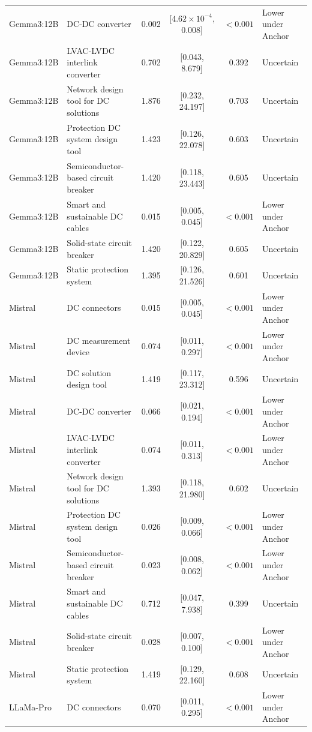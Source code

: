 \begin{longtable}[tbp]{p{2.2cm}p{5.0cm}cccp{3.2cm}}
Gemma3:12B & DC-DC converter & 0.002 & [$4.62\times 10^{-4}$, 0.008] & $<0.001$ & Lower under Anchor \\
Gemma3:12B & LVAC-LVDC interlink converter & 0.702 & [0.043, 8.679] & 0.392 & Uncertain \\
Gemma3:12B & Network design tool for DC solutions & 1.876 & [0.232, 24.197] & 0.703 & Uncertain \\
Gemma3:12B & Protection DC system design tool & 1.423 & [0.126, 22.078] & 0.603 & Uncertain \\
Gemma3:12B & Semiconductor-based circuit breaker & 1.420 & [0.118, 23.443] & 0.605 & Uncertain \\
Gemma3:12B & Smart and sustainable DC cables & 0.015 & [0.005, 0.045] & $<0.001$ & Lower under Anchor \\
Gemma3:12B & Solid-state circuit breaker & 1.420 & [0.122, 20.829] & 0.605 & Uncertain \\
Gemma3:12B & Static protection system & 1.395 & [0.126, 21.526] & 0.601 & Uncertain \\
Mistral & DC connectors & 0.015 & [0.005, 0.045] & $<0.001$ & Lower under Anchor \\
Mistral & DC measurement device & 0.074 & [0.011, 0.297] & $<0.001$ & Lower under Anchor \\
Mistral & DC solution design tool & 1.419 & [0.117, 23.312] & 0.596 & Uncertain \\
Mistral & DC-DC converter & 0.066 & [0.021, 0.194] & $<0.001$ & Lower under Anchor \\
Mistral & LVAC-LVDC interlink converter & 0.074 & [0.011, 0.313] & $<0.001$ & Lower under Anchor \\
Mistral & Network design tool for DC solutions & 1.393 & [0.118, 21.980] & 0.602 & Uncertain \\
Mistral & Protection DC system design tool & 0.026 & [0.009, 0.066] & $<0.001$ & Lower under Anchor \\
Mistral & Semiconductor-based circuit breaker & 0.023 & [0.008, 0.062] & $<0.001$ & Lower under Anchor \\
Mistral & Smart and sustainable DC cables & 0.712 & [0.047, 7.938] & 0.399 & Uncertain \\
Mistral & Solid-state circuit breaker & 0.028 & [0.007, 0.100] & $<0.001$ & Lower under Anchor \\
Mistral & Static protection system & 1.419 & [0.129, 22.160] & 0.608 & Uncertain \\
LLaMa-Pro & DC connectors & 0.070 & [0.011, 0.295] & $<0.001$ & Lower under Anchor \\

\end{longtable}
